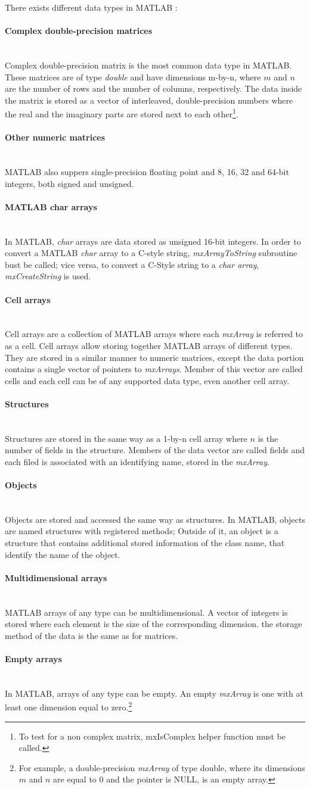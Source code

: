 \documentclass[12pt,a4paper]{extarticle}
\newcommand{\linespace}{\vspace{0pt}}
\newcommand{\myparagraph}[1]{\paragraph{#1}\mbox{}\\}
\begin{document}
There exists different data types in MATLAB \cite{matlab_data}:
\myparagraph{Complex double-precision matrices}
Complex double-precision matrix is the most common data type in MATLAB. These matrices are of type \textit{double} and have dimensions m-by-n, where $m$ and $n$ are the number of rows and the number of columns, respectively. The data inside the matrix is stored as a vector of interleaved, double-precision numbers where the real and the imaginary parts are stored next to each other\footnote{To test for a non complex matrix, mxIsComplex helper function must be called.}.
\myparagraph{Other numeric matrices}
MATLAB also suppers single-precision floating point and 8, 16, 32 and 64-bit integers, both signed and unsigned.
\myparagraph{MATLAB char arrays}
In MATLAB, \textit{char} arrays are data stored as unsigned 16-bit integers. In order to convert a MATLAB \textit{char} array to a C-style string, \textit{mxArrayToString} subroutine bust be called; vice versa, to convert a C-Style string to a \textit{char array}, \textit{mxCreateString} is used.
\myparagraph{Cell arrays}
Cell arrays are a collection of MATLAB arrays where each \textit{mxArray} is referred to as a cell. Cell arrays allow storing together MATLAB arrays of different types. They are stored in a similar manner to numeric matrices, except the data portion contains a single vector of pointers to \textit{mxArrays}. Member of this vector are called cells and each cell can be of any supported data type, even another cell array.
\myparagraph{Structures}
Structures are stored in the same way as a 1-by-n cell array where $n$ is the number of fields in the structure. Members of the data vector are called fields and each filed is associated with an identifying name, stored in the \textit{mxArray}.
\myparagraph{Objects}
Objects are stored and accessed the same way as structures. In MATLAB, objects are named structures with registered methods; Outside of it, an object is a structure that contains additional stored information of the class name, that identify the name of the object.
\myparagraph{Multidimensional arrays}
MATLAB arrays of any type can be multidimensional. A vector of integers is stored where each element is the size of the corresponding dimension. the storage method of the data is the same as for matrices.
\myparagraph{Empty arrays}
In MATLAB, arrays of any type can be empty. An empty \textit{mxArray} is one with at least one dimension equal to zero.\footnote{For example, a double-precision \textit{mxArray} of type double, where its dimensions $m$ and $n$ are equal to 0 and the pointer is NULL, is an empty array.} 
\linespace
\end{document}
